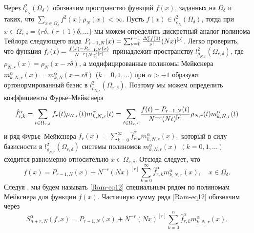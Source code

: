 Через $l_{\rho_N}^2(\Omega_\delta)$ обозначим пространство функций $f(x)$, заданных на $\Omega_\delta$ и таких, что $\sum_{x\in\Omega_\delta}f^2(x)\rho_N(x)<\infty$.
Пусть $f(x)\in l_{\rho_N}^2(\Omega_\delta)$, тогда при $x\in\Omega_{r,\delta}=\{r\delta, (r+1)\delta,\ldots\}$ мы можем определить дискретный аналог полинома Тейлора следующего вида
$P_{r-1,N}(x)=\sum_{\nu=0}^{r-1}{\Delta^{\nu}_{\delta}f(0)\over \nu!}(Nx)^{[\nu]}$.
Легко проверить, что функция $f_r(x)={{f(x)-P_{r-1,N}(x)}\over N^{-r}(Nx)^{[r]}}$ принадлежит пространству $l_{\rho_{N,r}}^2(\Omega_{r,\delta})$, где $\rho_{N,r}(x)=\rho_N(x-r\delta)$, а модифицированные полиномы Мейкснера $m_{k,N,r}^\alpha(x)=m_{k,N}^\alpha(x-r\delta)$ ($k=0, 1, \ldots$) при $\alpha>-1$
образуют ортонормированный базис в $l_{\rho_{N,r}}^2(\Omega_{r,\delta})$.
Поэтому мы можем определить коэффициенты Фурье--Мейкснера
$$
\hat{f}_{r,k}^\alpha=\sum_{t\in\Omega_{r,\delta}}f_r(t)\rho_{N,r}(t)m_{k,N,r}^\alpha(t)=
\sum_{t\in\Omega_{r,\delta}}{{f(t)-P_{r-1,N}(t)}\over N^{-r}(Nt)^{[r]}}\rho_{N,r}(t)m_{k,N,r}^\alpha(t)
$$
и ряд Фурье--Мейкснера
$
f_r(x)=\sum_{k=0}^\infty\hat{f}_{r,k}^\alpha m_{k,N,r}^\alpha(x),
$
который в силу базисности в \linebreak $l_{\rho_{N,r}}^2(\Omega_{r,\delta})$ системы полиномов $m_{k,N,r}^\alpha(x)$ $(k=0, 1, \ldots)$ сходится равномерно относительно $x\in\Omega_{r,\delta}$.
Отсюда следует, что
\begin{equation}\label{Ram-eq12}
f(x)=P_{r-1,N}(x)+N^{-r}(Nx)^{[r]}\sum_{k=0}^\infty\hat{f}_{r,k}^\alpha m_{k,N,r}^\alpha(x), \quad x\in\Omega_\delta.
\end{equation}
 Следуя \cite{RamSar, RamVMJ}, мы будем называть \eqref{Ram-eq12} специальным рядом по полиномам Мейкснера для функции $f(x)$. Частичную сумму ряда \eqref{Ram-eq12} обозначим через
\begin{equation*}
S_{n+r,N}^\alpha(f,x)=P_{r-1,N}(x)+N^{-r}(Nx)^{[r]}\sum_{k=0}^{n}\hat{f}_{r,k}^\alpha m_{k,N,r}^\alpha(x).
\end{equation*}

